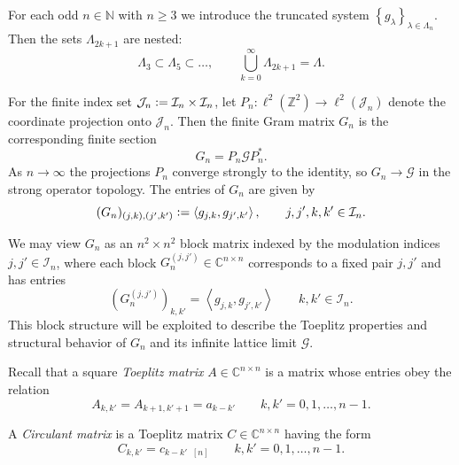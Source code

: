 \documentclass{article}
\newcommand{\Z}{\mathbb{Z}}
\newcommand{\C}{\mathbb{C}}
\renewcommand{\mod}[1]{\ensuremath{\mathop{}[#1]}}
\newcommand{\set}[1]{\ensuremath{\left\{#1\right\}}}
\newcommand{\ip}[1]{\ensuremath{\left\langle#1\right\rangle}}
\newcommand{\defeq}{\vcentcolon=}
\begin{document}
For each odd \(n \in \mathbb{N}\) with \(n \geq 3\) we introduce the truncated
system \(\set{g_{\lambda}}_{\lambda \in \Lambda_n}\). Then the sets
\(\Lambda_{2k+1}\) are nested:
\begin{equation*}
	\Lambda_3 \subset \Lambda_5 \subset \hdots, \qquad
		\bigcup_{k = 0}^\infty \Lambda_{2k+1} = \Lambda.
\end{equation*}

For the finite index set \(\mathcal{J}_n \defeq \mathcal{I}_n \times
\mathcal{I}_n\), let \(P_n : \ell^2(\Z^2) \to \ell^2(\mathcal{J}_n)\) denote
the coordinate projection onto \(\mathcal{J}_n\). Then the finite Gram
matrix \(G_n\) is the corresponding finite section
\begin{equation*}
	G_n = P_n \mathscr{G} P_n^*.
\end{equation*}
As \(n \to \infty\) the projections \(P_n\) converge strongly to the
identity, so \(G_n \to \mathscr{G}\) in the strong operator topology. The
entries of \(G_n\) are given by
\begin{equation}\label{eq:gram_entry}
	(G_n)_{(j,k), (j',k')} \defeq \ip{g_{j,k}, g_{j',k'}}, \qquad
		j, j', k, k' \in \mathcal{I}_n.
\end{equation}

We may view \(G_n\) as an \(n^2 \times n^2\) block matrix indexed by the
modulation indices \(j,j' \in \mathcal{I}_n\), where each block
\(G_n^{(j,j')} \in \C^{n \times n}\) corresponds to a fixed pair
\(j,j'\) and has entries
\begin{equation*}
	(G_n^{(j,j')})_{k,k'} = \ip{g_{j,k}, g_{j',k'}} \qquad
		k, k' \in \mathcal{I}_n.
\end{equation*}
This block structure will be exploited to describe the Toeplitz
properties and structural behavior of \(G_n\) and its infinite lattice
limit \(\mathscr{G}\).

Recall that a square \textit{Toeplitz matrix} \(A \in \C^{n \times n}\)
is a matrix whose entries obey the relation
\begin{equation*}
	A_{k,k'} = A_{k+1,k'+1} = a_{k-k'} \qquad
		k, k' = 0, 1, \ldots, n-1.
\end{equation*}

A \textit{Circulant matrix} is a Toeplitz matrix \(C \in \C^{n \times
n}\) having the form
\begin{equation*}
	C_{k,k'} = c_{k-k' \mod n} \qquad
		k, k' = 0, 1, \ldots, n-1.
\end{equation*}
\end{document}
